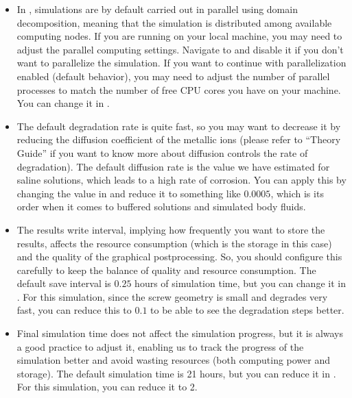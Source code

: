 \begin{itemize}
\item
In \biodeg{}, simulations are by default carried out in parallel using domain decomposition, meaning that the simulation is distributed among available computing nodes. If you are running \biodeg{} on your local machine, you may need to adjust the parallel computing settings. Navigate to  and disable it if you don't want to parallelize the simulation. If you want to continue with parallelization enabled (default behavior), you may need to adjust the number of parallel processes to match the number of free CPU cores you have on your machine. You can change it in . 
\item
The default degradation rate is quite fast, so you may want to decrease it by reducing the diffusion coefficient of the metallic ions (please refer to ``Theory Guide'' if you want to know more about diffusion controls the rate of degradation). The default diffusion rate is the value we have estimated for saline solutions, which leads to a high rate of corrosion. You can apply this by changing the value in  and reduce it to something like $0.0005$, which is its order when it comes to buffered solutions and simulated body fluids.
\item
The results write interval, implying how frequently you want to store the results, affects the resource consumption (which is the storage in this case) and the quality of the graphical postprocessing. So, you should configure this carefully to keep the balance of quality and resource consumption. The default save interval is $0.25$ hours of simulation time, but you can change it in . For this simulation, since the screw geometry is small and degrades very fast, you can reduce this to $0.1$ to be able to see the degradation steps better.
\item
Final simulation time does not affect the simulation progress, but it is always a good practice to adjust it, enabling us to track the progress of the simulation better and avoid wasting resources (both computing power and storage). The default simulation time is 21 hours, but you can reduce it in . For this simulation, you can reduce it to 2.
\end{itemize}

